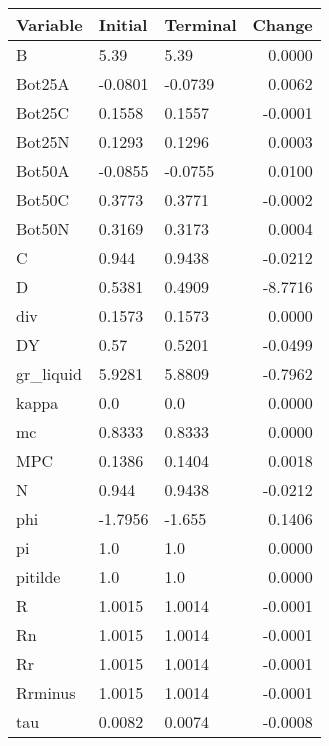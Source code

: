 \begin{table}
\centering
\label{tab:stst_comparison_end_L_limit_permanent}
\begin{tabular}{lllr}
\toprule
                Variable & Initial & Terminal &  Change \\
\midrule
                       B &    5.39 &     5.39 &  0.0000 \\
                  Bot25A & -0.0801 &  -0.0739 &  0.0062 \\
                  Bot25C &  0.1558 &   0.1557 & -0.0001 \\
                  Bot25N &  0.1293 &   0.1296 &  0.0003 \\
                  Bot50A & -0.0855 &  -0.0755 &  0.0100 \\
                  Bot50C &  0.3773 &   0.3771 & -0.0002 \\
                  Bot50N &  0.3169 &   0.3173 &  0.0004 \\
                       C &   0.944 &   0.9438 & -0.0212 \\
                       D &  0.5381 &   0.4909 & -8.7716 \\
                     div &  0.1573 &   0.1573 &  0.0000 \\
                      DY &    0.57 &   0.5201 & -0.0499 \\
               gr\_liquid &  5.9281 &   5.8809 & -0.7962 \\
                   kappa &     0.0 &      0.0 &  0.0000 \\
                      mc &  0.8333 &   0.8333 &  0.0000 \\
                     MPC &  0.1386 &   0.1404 &  0.0018 \\
                       N &   0.944 &   0.9438 & -0.0212 \\
                     phi & -1.7956 &   -1.655 &  0.1406 \\
                      pi &     1.0 &      1.0 &  0.0000 \\
                 pitilde &     1.0 &      1.0 &  0.0000 \\
                       R &  1.0015 &   1.0014 & -0.0001 \\
                      Rn &  1.0015 &   1.0014 & -0.0001 \\
                      Rr &  1.0015 &   1.0014 & -0.0001 \\
                 Rrminus &  1.0015 &   1.0014 & -0.0001 \\
                     tau &  0.0082 &   0.0074 & -0.0008 \\

\end{tabular}
\end{table}
